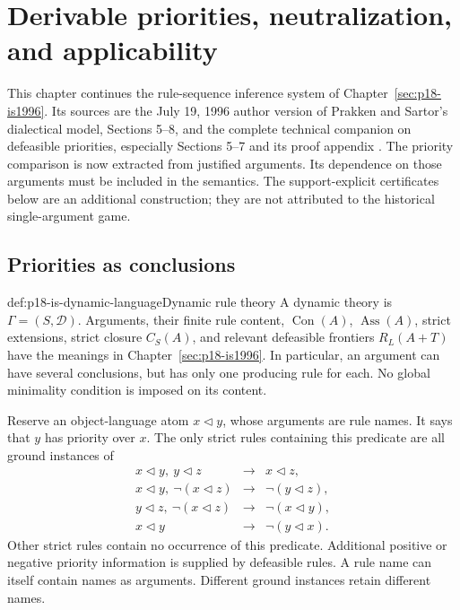 \chapter{Derivable priorities, neutralization, and applicability}
\label{sec:p18-is-dynamic}

This chapter continues the rule-sequence inference system of
Chapter~\ref{sec:p18-is1996}. Its sources are the July 19, 1996 author
version of Prakken and Sartor's dialectical model, Sections 5--8,
and the complete technical companion on defeasible priorities,
especially Sections 5--7 and its proof appendix
\cite{PrakkenSartor1996Dialectical,PrakkenSartor1997Priorities}.
The priority comparison is now extracted from justified arguments.
Its dependence on those arguments must be included in the semantics.
The support-explicit certificates below are an additional construction;
they are not attributed to the historical single-argument game.

\section{Priorities as conclusions}

\begin{hbdefinition}{def:p18-is-dynamic-language}{Dynamic rule theory}
A dynamic theory is \(\Gamma=(S,\mathcal D)\). Arguments, their finite
rule content, \(\operatorname{Con}(A)\), \(\operatorname{Ass}(A)\),
strict extensions, strict closure \(C_S(A)\), and relevant defeasible
frontiers \(R_L(A+T)\) have the meanings in
Chapter~\ref{sec:p18-is1996}. In particular, an argument can have
several conclusions, but has only one producing rule for each.
No global minimality condition is imposed on its content.

Reserve an object-language atom \(x\triangleleft y\), whose arguments
are rule names. It says that \(y\) has priority over \(x\).
The only strict rules containing this predicate are all ground
instances of
\[
\begin{array}{rcl}
x\triangleleft y,\ y\triangleleft z&\to&x\triangleleft z,\\
x\triangleleft y,\ \neg(x\triangleleft z)&\to&
                                      \neg(y\triangleleft z),\\
y\triangleleft z,\ \neg(x\triangleleft z)&\to&
                                      \neg(x\triangleleft y),\\
x\triangleleft y&\to&\neg(y\triangleleft x).
\end{array}
\]
Other strict rules contain no occurrence of this predicate.
Additional positive or negative priority information is supplied by
defeasible rules. A rule name can itself contain names as arguments.
Different ground instances retain different names.
\end{hbdefinition}

